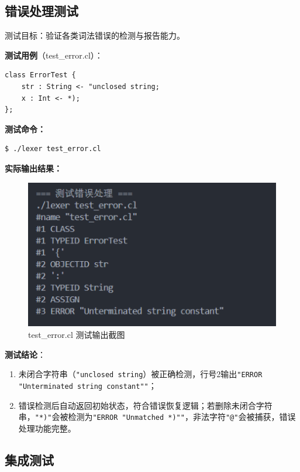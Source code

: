 \documentclass[twocolumn]{article}
\begin{document}
\subsection{错误处理测试}

测试目标：验证各类词法错误的检测与报告能力。

\textbf{测试用例}（test\_error.cl）：
\begin{lstlisting}[language=cool, caption={错误处理测试}]
class ErrorTest {
    str : String <- "unclosed string;
    x : Int <- *);
};
\end{lstlisting}

\textbf{测试命令：}
\begin{verbatim}
$ ./lexer test_error.cl
\end{verbatim}

\textbf{实际输出结果：}
\begin{figure}[H]
    \centering
    \includegraphics[width=\linewidth]{test_error.png}  %
    \caption{test\_error.cl 测试输出截图}  %
\end{figure}

\textbf{测试结论}：
\begin{enumerate}
    \item 未闭合字符串（\verb|"unclosed string|）被正确检测，行号2输出\verb|"ERROR "Unterminated string constant""|；
    
    \item 错误检测后自动返回初始状态，符合错误恢复逻辑；若删除未闭合字符串，\verb|"*)"|会被检测为\verb|"ERROR "Unmatched *)""|，非法字符\verb|"@"|会被捕获，错误处理功能完整。
\end{enumerate}

\subsection{集成测试}
\end{document}
